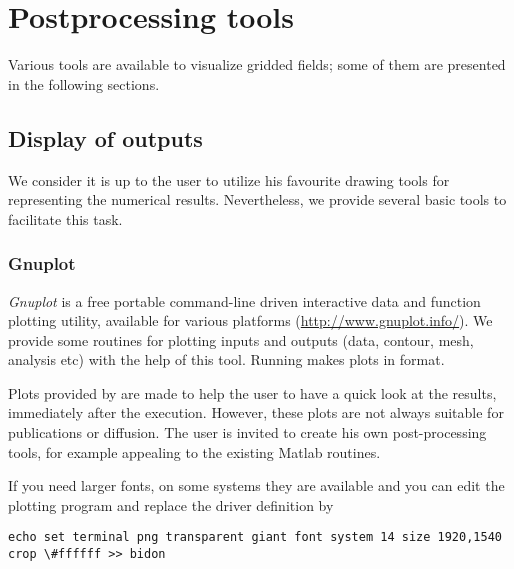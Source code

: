 \chapter{Postprocessing tools\label{chap:postprocessing}}

Various tools are available to visualize gridded fields; some of them are presented in the following sections.

\minitoc


\section{Display of outputs\label{visutools}}

We consider it is up to the user to utilize his favourite drawing tools for representing the numerical results. Nevertheless, we provide several basic tools to facilitate this task.

\subsection{Gnuplot\label{sec:visugnuplot}}

\textsl{Gnuplot} is a free portable command-line driven interactive data and function plotting utility, available for various platforms (\url{http://www.gnuplot.info/}). We provide some routines for plotting \diva inputs and outputs (data, contour, mesh, analysis etc) with the help of this tool. Running  makes plots in  format. 

\begin{tips}
Plots provided by \gnuplot are made to help the user to have a quick look at the results, immediately after the execution. However, these plots are not always suitable for publications or diffusion. The user is invited to create his own post-processing tools, for example appealing to the existing Matlab routines.
\end{tips}

\begin{tips}
If you need larger fonts, on some systems they are available and you can edit the plotting program 
and replace the driver definition by
\begin{tiny}
\begin{verbatim}
echo set terminal png transparent giant font system 14 size 1920,1540 crop \#ffffff >> bidon
\end{verbatim}
\end{tiny}
\end{tips}

